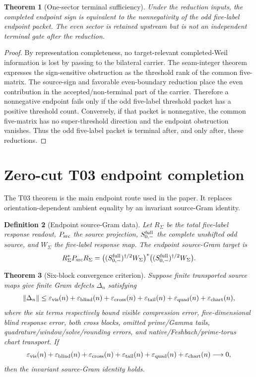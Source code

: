 \documentclass[11pt]{article}
\newtheorem{theorem}{Theorem}[section]
\newtheorem{definition}[theorem]{Definition}
\newcommand{\Psrc}{P_{\rm src}}
\newcommand{\RSigma}{R_\Sigma}
\newcommand{\WSigma}{W_\Sigma}
\newcommand{\Sminus}{S_{0,-}^{\rm full}}
\newcommand{\eps}{\varepsilon}
\begin{document}
\begin{theorem}[One-sector terminal sufficiency]
Under the reduction inputs, the completed endpoint sign is equivalent to the nonnegativity of the odd five-label endpoint packet.  The even sector is retained upstream but is not an independent terminal gate after the reduction.
\end{theorem}

\begin{proof}
By representation completeness, no target-relevant completed-Weil information is lost by passing to the bilateral carrier.  The seam-integer theorem expresses the sign-sensitive obstruction as the threshold rank of the common five-matrix.  The source-sign and favorable even-boundary reduction place the even contribution in the accepted/non-terminal part of the carrier.  Therefore a nonnegative endpoint fails only if the odd five-label threshold packet has a positive threshold count.  Conversely, if that packet is nonnegative, the common five-matrix has no super-threshold direction and the endpoint obstruction vanishes.  Thus the odd five-label packet is terminal after, and only after, these reductions.
\end{proof}

\section{Zero-cut T03 endpoint completion}

The T03 theorem is the main endpoint route used in the paper.  It replaces orientation-dependent ambient equality by an invariant source-Gram identity.

\begin{definition}[Endpoint source-Gram data]
Let \(\RSigma\) be the total five-label response readout, \(\Psrc\) the source projection, \(\Sminus\) the complete unshifted odd source, and \(\WSigma\) the five-label response map.  The endpoint source-Gram target is
\[
\RSigma^*\Psrc\RSigma
=
\bigl((\Sminus)^{\dagger/2}\WSigma\bigr)^*
\bigl((\Sminus)^{\dagger/2}\WSigma\bigr).
\]
\end{definition}

\begin{theorem}[Six-block convergence criterion]
Suppose finite transported source maps give finite Gram defects \(\Delta_n\) satisfying
\[
\|\Delta_n\|\le
\eps_{\rm vis}(n)+\eps_{\rm blind}(n)+\eps_{\rm cross}(n)
+\eps_{\rm tail}(n)+\eps_{\rm quad}(n)+\eps_{\rm chart}(n),
\]
where the six terms respectively bound visible compression error, five-dimensional blind response error, both cross blocks, omitted prime/Gamma tails, quadrature/window/solve/rounding errors, and native/Feshbach/prime-torus chart transport.  If
\[
\eps_{\rm vis}(n)+\eps_{\rm blind}(n)+\eps_{\rm cross}(n)
+\eps_{\rm tail}(n)+\eps_{\rm quad}(n)+\eps_{\rm chart}(n)\longrightarrow0,
\]
then the invariant source-Gram identity holds.
\end{theorem}
\end{document}
